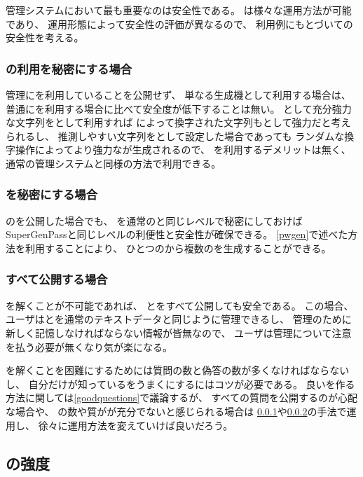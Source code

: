 \documentclass[twoside]{wiss}
\begin{document}
{\PW}管理システムにおいて最も重要なのは安全性である。
%
{\EP}は様々な運用方法が可能であり、
運用形態によって安全性の評価が異なるので、
利用例にもとづいて{\EP}の安全性を考える。

\subsubsection{\protect{\textsf{\EP}}の利用を秘密にする場合}
\label{pattern1}

{\PW}管理に{\EP}を利用していることを公開せず、
単なる{\PW}生成機として利用する場合は、
普通に{\PW}を利用する場合に比べて安全度が低下することは無い。
{\PW}として充分強力な文字列を{\SS}として利用すれば
{\EP}によって換字された文字列も{\PW}として強力だと考えられるし、
推測しやすい文字列を{\SS}として設定した場合であっても
ランダムな換字操作によってより強力な{\PW}が生成されるので、
{\EP}を利用するデメリットは無く、
通常の{\PW}管理システムと同様の方法で利用できる。

\subsubsection{{\SS}を秘密にする場合}
\label{pattern2}

{\EP}の{\SQ}を公開した場合でも、
{\SS}を通常の{\PW}と同じレベルで秘密にしておけば
SuperGenPass\cite{SuperGenPass}と同じレベルの利便性と安全性が確保できる。
\ref{pwgen}で述べた方法を利用することにより、
ひとつの{\SS}から複数の{\PW}を生成することができる。

\subsubsection{すべて公開する場合}
\label{pattern3}

{\SQ}を解くことが不可能であれば、
{\SS}と{\SQ}をすべて公開しても安全である。
この場合、
ユーザは{\SQ}と{\SS}を通常のテキストデータと同じように管理できるし、
{\PW}管理のために新しく記憶しなければならない情報が皆無なので、
ユーザは{\PW}管理について注意を払う必要が無くなり気が楽になる。

{\SQ}を解くことを困難にするためには質問の数と偽答の数が多くなければならないし、
自分だけが知っている{\EM}をうまく{\SQ}にするにはコツが必要である。
良い{\SQ}を作る方法に関しては\ref{goodquestions}で議論するが、
すべての質問を公開するのが心配な場合や、
{\SQ}の数や質がが充分でないと感じられる場合は
\ref{pattern1}や\ref{pattern2}の手法で運用し、
徐々に運用方法を変えていけば良いだろう。

\subsection{{\SQ}の強度}
\end{document}
